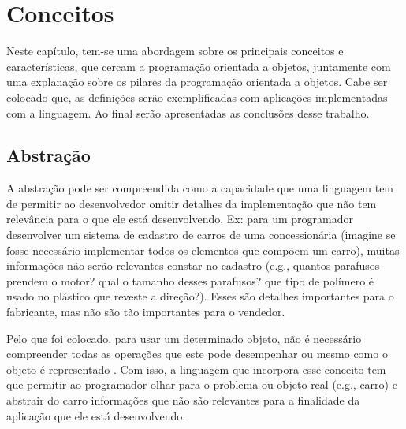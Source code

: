 \documentclass[11pt,a4paper]{article}
\begin{document}



% 



\vspace{0.3in}
\vspace{0.3in}
\vspace{0.3in}

\section{Conceitos}
Neste capítulo, tem-se uma abordagem sobre os principais conceitos e características, que cercam a programação orientada a objetos, juntamente com uma explanação sobre os pilares da programação orientada a objetos. Cabe ser colocado que, as definições serão exemplificadas com aplicações implementadas com a linguagem. Ao final serão apresentadas as conclusões desse trabalho.

\subsection{Abstração}

A abstração pode ser compreendida como a capacidade que uma linguagem tem de permitir ao desenvolvedor omitir detalhes da implementação que não tem relevância para o que ele está desenvolvendo. Ex: para um programador desenvolver um sistema de cadastro de carros de uma concessionária (imagine se fosse necessário implementar todos os elementos que compõem um carro), muitas informações não serão relevantes constar no cadastro (e.g., quantos parafusos prendem o motor? qual o tamanho desses parafusos? que tipo de polímero é usado no plástico que reveste a direção?). Esses são detalhes importantes para o fabricante, mas não são tão importantes para o vendedor.

\vspace{0.1in}

Pelo que foi colocado, para usar um determinado objeto, não é necessário compreender todas as operações que este pode desempenhar ou mesmo como o objeto é representado \cite{snyder1986encapsulation}. Com isso, a linguagem que incorpora esse conceito tem que permitir ao programador olhar para o problema ou objeto real (e.g., carro) e abstrair do carro informações que não são relevantes para a finalidade da aplicação que ele está desenvolvendo.
\end{document}
